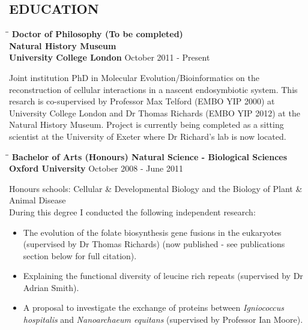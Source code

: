 \documentclass{res}
\begin{document}
\begin{resume}
        
\section{EDUCATION}          

\vspace{-0.05in}
\begin{tabbing}
   \hspace{2in}\= \hspace{2.6in}\= \kill 
    {\bf Doctor of Philosophy (To be completed)}\\ 
    {\bf Natural History Museum}\\
    {\bf University College London
    } \>      \>October 2011 - Present\\

   \end{tabbing}\vspace{-20pt}  
   
   Joint institution PhD in Molecular Evolution/Bioinformatics on the reconstruction of cellular interactions in a nascent endosymbiotic system.  This resarch is co-supervised by Professor Max Telford (EMBO YIP 2000) at University College London and Dr Thomas Richards (EMBO YIP 2012) at the Natural History Museum.  Project is currently being completed as a sitting scientist at the University of Exeter where Dr Richard's lab is now located.

\vspace{-0.1in}
 \begin{tabbing}
   \hspace{2in}\= \hspace{2.6in}\= \kill 
     {\bf Bachelor of Arts (Honours) Natural Science - Biological Sciences}\\
    {\bf Oxford University
    } \>      \>October 2008 - June 2011\\
                          

   \end{tabbing}\vspace{-20pt}  
Honours schools: Cellular \& Developmental Biology and the Biology of Plant \& Animal Disease\\
During this degree I conducted the following independent research:
\begin{itemize}
        \vspace{-10pt}
    \item The evolution of the folate biosynthesis gene fusions in the eukaryotes (supervised by Dr Thomas Richards) (now published - see publications section below for full citation).
    \item Explaining the functional diversity of leucine rich repeats (supervised by Dr Adrian Smith).
    \item A proposal to investigate the exchange of proteins between  \emph{Igniococcus hospitalis} and  \emph{Nanoarchaeum equitans} (supervised by Professor Ian Moore).
\end{itemize}



\end{resume}
\end{document}
